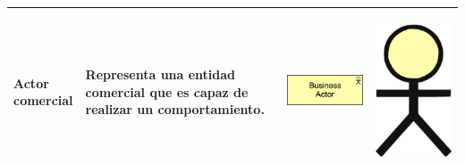 \begin{longtable}{|p{0.15\linewidth}|p{0.45\linewidth}|p{0.2\linewidth} p{0.2\linewidth}|}
    Actor comercial 
    &
    Representa una entidad comercial  que es capaz de realizar un comportamiento.
    &
\begin{center}
    \includegraphics[width=1\linewidth]{imgs/capa_de_negocios/1.pdf}
\end{center} 
&
\begin{center}
    \includegraphics[width=0.3\linewidth]{imgs/capa_de_negocios/a1.pdf}
\end{center}
    \\ \hline




\end{longtable}
